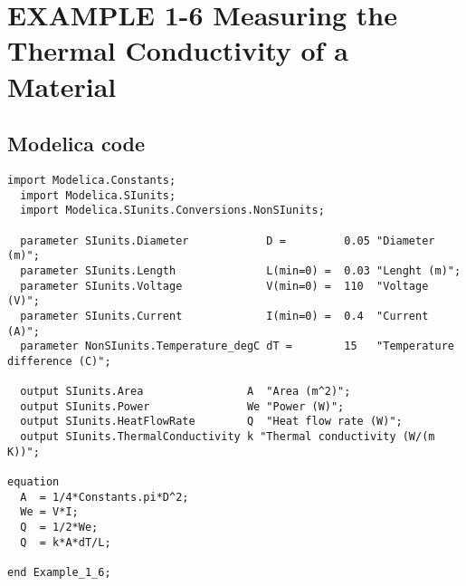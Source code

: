 \documentclass{modelica}
\begin{document}
\thispagestyle{empty}
\date{} %

\section*{EXAMPLE 1-6 Measuring the Thermal Conductivity of a Material}

\subsection*{Modelica code}


\begin{lstlisting}[mathescape=true] 
  import Modelica.Constants;
  import Modelica.SIunits;
  import Modelica.SIunits.Conversions.NonSIunits;

  parameter SIunits.Diameter            D =         0.05 "Diameter (m)";
  parameter SIunits.Length              L(min=0) =  0.03 "Lenght (m)";
  parameter SIunits.Voltage             V(min=0) =  110  "Voltage (V)";
  parameter SIunits.Current             I(min=0) =  0.4  "Current (A)";
  parameter NonSIunits.Temperature_degC dT =        15   "Temperature difference (C)";

  output SIunits.Area                A  "Area (m^2)";
  output SIunits.Power               We "Power (W)";
  output SIunits.HeatFlowRate        Q  "Heat flow rate (W)";
  output SIunits.ThermalConductivity k "Thermal conductivity (W/(m K))";

equation 
  A  = 1/4*Constants.pi*D^2;
  We = V*I;
  Q  = 1/2*We;
  Q  = k*A*dT/L;
  
end Example_1_6;  
\end{lstlisting}
\end{document}

